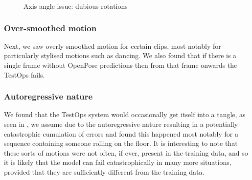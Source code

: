 \begin{figure}[!ht]
{    }
    \hfil
    \caption{Axis angle issue: dubious rotations}
    \label{fig:humor_bad_aa}
\end{figure}

\subsubsection{Over-smoothed motion}
Next, we saw overly smoothed motion for certain clips, most notably for particularly stylised motions such as dancing.  We also found that if there is a single frame without OpenPose predictions then from that frame onwards the TestOps fails. 

\subsubsection{Autoregressive nature}
We found that the TestOps system would occasionally get itself into a tangle, as seen in , we assume due to the autoregressive nature resulting in a potentially catastrophic cumulation of errors and found this happened most notably for a sequence containing someone rolling on the floor. It is interesting to note that these sorts of motions were not often, if ever, present in the training data, and so it is likely that the model can fail catastrophically in many more situations, provided that they are sufficiently different from the training data.

